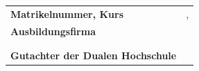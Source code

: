 {\begin{titlepage}
\begin{center}
\begin{spacing}{0.8}
\begin{tabular}{ll}
				\textbf{Matrikelnummer, Kurs} 					   	&  \matrikelnr, \kurs\\[0.2cm]
				\textbf{Ausbildungsfirma}              					 &  \firmaName\\
																						& \firmaStrasse \\
																						& \firmaPlz\\[0.2cm]
				\textbf{Gutachter der Dualen Hochschule}    &  \betreuerDhbw\\[0.2cm]
			\end{tabular} 
		\end{spacing}
	\end{center}
\end{titlepage}
}